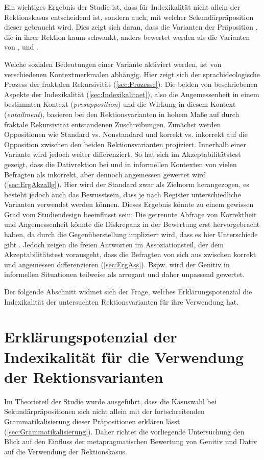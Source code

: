 Ein wichtiges Ergebnis der Studie ist, dass für Indexikalität nicht allein der Rektionskasus entscheidend ist, sondern auch, mit welcher Sekundärpräposition dieser gebraucht wird. 
Dies zeigt sich daran, dass die Varianten der Präposition \gegenueber{}, die in ihrer Rektion kaum schwankt, anders bewertet werden als die Varianten von \wegen, \waehrend{} und \dank. 

Welche sozialen Bedeutungen einer Variante aktiviert werden, ist von verschiedenen Kontextmerkmalen abhängig. 
Hier zeigt sich der sprachideologische Prozess der fraktalen Rekursivität (\autoref{sec:Prozesse}): 
Die beiden von \citet{Silverstein2003} beschriebenen Aspekte der Indexikalität (\autoref{sec:Indexikalitaet}), also die Angemessenheit  in einem bestimmten Kontext (\textit{presupposition}) und die Wirkung in diesem Kontext (\textit{entailment}), basieren bei den Rektionsvarianten in hohem Maße auf durch fraktale Rekursivität entstandenen Zuschreibungen. 
Zunächst werden Oppositionen wie Standard vs. Nonstandard und korrekt vs. inkorrekt auf die Opposition zwischen den beiden Rektionsvarianten projiziert. 
Innerhalb einer Variante wird jedoch weiter differenziert. 
So hat sich im Akzeptabilitätstest gezeigt, dass die Dativrektion bei \wegen{} und \waehrend{} in informellen Kontexten von vielen Befragten als inkorrekt, aber dennoch angemessen gewertet wird (\autoref{sec:ErgAkzallg}). 
Hier wird der Standard zwar als Zielnorm herangezogen, es besteht jedoch auch das Bewusstsein, dass je nach Register unterschiedliche Varianten verwendet werden können. 
Dieses Ergebnis könnte zu einem gewissen Grad vom Studiendesign beeinflusst sein:
Die getrennte Abfrage von Korrektheit und Angemessenheit könnte die Diskrepanz in der Bewertung erst hervorgebracht haben, da durch die Gegenüberstellung impliziert wird, dass es hier Unterschiede gibt \citep[s.][190]{Wolfer.2020}. 
Jedoch zeigen die freien Antworten im Assoziationsteil, der dem Akzeptabilitätstest vorausgeht, dass die Befragten von sich aus zwischen korrekt und angemessen differenzieren (\autoref{sec:ErgAss}). 
Bspw. wird der Genitiv in informellen Situationen teilweise als arrogant und daher unpassend gewertet. 

Der folgende Abschnitt widmet sich der Frage, welches Erklärungspotenzial die Indexikalität der untersuchten Rektionsvarianten für ihre Verwendung hat. 
\section[Erklärungspotenzial der Indexikalität]{Erklärungspotenzial der Indexikalität für die Verwendung der Rektionsvarianten}
\label{sec:DiskVariationundWandel}
Im Theorieteil der Studie wurde ausgeführt, dass die Kasuswahl bei Sekundärpräpositionen sich nicht allein mit der fortschreitenden Grammatikalisierung dieser Präpositionen erklären lässt (\autoref{sec:Grammatikalisierung}). 
Daher richtet die vorliegende Untersuchung den Blick auf den Einfluss der metapragmatischen Bewertung von Genitiv und Dativ auf die Verwendung der Rektionskasus. 

